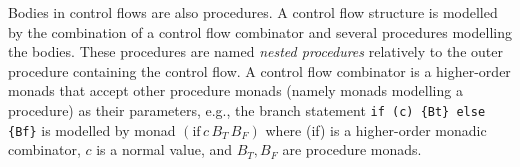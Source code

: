Bodies in control flows are also procedures.
A control flow structure is modelled by the combination of a control flow combinator and several procedures modelling the bodies.
These procedures are named {\it nested procedures} relatively to the outer procedure containing the control flow.
A control flow combinator is a higher-order monads that accept other procedure monads (namely monads modelling a procedure) as their parameters, e.g.,
the branch statement \texttt{if (c) \{Bt\} else \{Bf\}} is modelled by monad $(\mathrm{if}\,c\,B_T\,B_F)$ where (if) is a higher-order monadic combinator, $c$ is a normal value, and $B_T, B_F$ are procedure monads.

